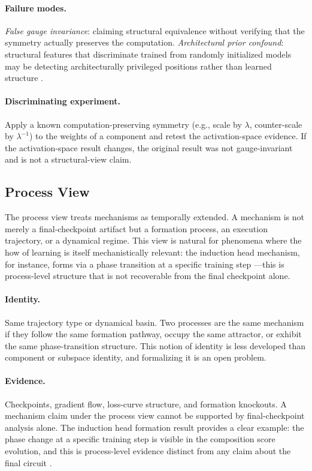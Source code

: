 \documentclass[11pt]{article}
\theoremstyle{remark}
\begin{document}
\paragraph{Failure modes.}
\emph{False gauge invariance}: claiming structural equivalence without
verifying that the symmetry actually preserves the computation.
\emph{Architectural prior confound}: structural features that
discriminate trained from randomly initialized models may be detecting
architecturally privileged positions rather than learned structure
\citep{tower2026weight}.

\paragraph{Discriminating experiment.}
Apply a known computation-preserving symmetry (e.g., scale by $\lambda$,
counter-scale by $\lambda^{-1}$) to the weights of a component and
retest the activation-space evidence.  If the activation-space result
changes, the original result was not gauge-invariant and is not a
structural-view claim.

\subsection{Process View}

The process view treats mechanisms as temporally extended.  A mechanism
is not merely a final-checkpoint artifact but a formation process, an
execution trajectory, or a dynamical regime.  This view is natural for
phenomena where the how of learning is itself mechanistically relevant:
the induction head mechanism, for instance, forms via a phase transition
at a specific training step \citep{olsson2022}---this is process-level
structure that is not recoverable from the final checkpoint alone.

\paragraph{Identity.}
Same trajectory type or dynamical basin.  Two processes are the same
mechanism if they follow the same formation pathway, occupy the same
attractor, or exhibit the same phase-transition structure.  This notion
of identity is less developed than component or subspace identity, and
formalizing it is an open problem.

\paragraph{Evidence.}
Checkpoints, gradient flow, loss-curve structure, and formation knockouts.
A mechanism claim under the process view cannot be supported by
final-checkpoint analysis alone.  The induction head formation result
provides a clear example: the phase change at a specific training step
is visible in the composition score evolution, and this is process-level
evidence distinct from any claim about the final circuit \citep{olsson2022}.
\end{document}
